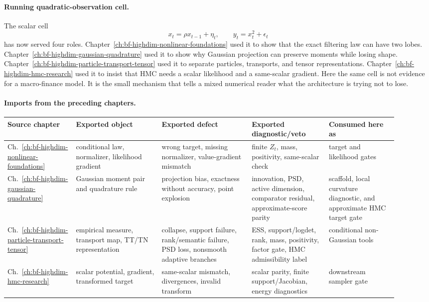 \paragraph{Running quadratic-observation cell.}
The scalar cell
\[
  x_t=\rho x_{t-1}+\eta_t,\qquad y_t=x_t^2+\epsilon_t
\]
has now served four roles.  Chapter~\ref{ch:bf-highdim-nonlinear-foundations}
used it to show that the exact filtering law can have two lobes.
Chapter~\ref{ch:bf-highdim-gaussian-quadrature} used it to show why Gaussian
projection can preserve moments while losing shape.
Chapter~\ref{ch:bf-highdim-particle-transport-tensor} used it to separate
particles, transports, and tensor representations.
Chapter~\ref{ch:bf-highdim-hmc-research} used it to insist that HMC needs a
scalar likelihood and a same-scalar gradient.  Here the same cell is not
evidence for a macro-finance model.  It is the small mechanism that tells a
mixed numerical reader what the architecture is trying not to lose.

\paragraph{Imports from the preceding chapters.}
\begingroup
\scriptsize
\setlength{\tabcolsep}{2pt}
\begin{longtable}{@{}p{0.16\linewidth}p{0.20\linewidth}p{0.21\linewidth}p{0.18\linewidth}p{0.16\linewidth}@{}}
\toprule
Source chapter & Exported object & Exported defect & Exported diagnostic/veto
& Consumed here as \\
\midrule
\endhead
Ch.~\ref{ch:bf-highdim-nonlinear-foundations} & conditional law, normalizer,
likelihood gradient & wrong target, missing normalizer, value-gradient
mismatch & finite \(Z_t\), mass, positivity, same-scalar check & target and
likelihood gates \\
Ch.~\ref{ch:bf-highdim-gaussian-quadrature} & Gaussian moment pair and
quadrature rule & projection bias, exactness without accuracy, point explosion
& innovation, PSD, active dimension, comparator residual, approximate-score
parity & scaffold, local curvature diagnostic, and approximate HMC target gate \\
Ch.~\ref{ch:bf-highdim-particle-transport-tensor} & empirical measure,
transport map, TT/TN representation & collapse, support failure, rank/semantic
failure, PSD loss, nonsmooth adaptive branches & ESS, support/logdet, rank,
mass, positivity, factor gate, HMC admissibility label & conditional
non-Gaussian tools \\
Ch.~\ref{ch:bf-highdim-hmc-research} & scalar potential, gradient, transformed
target & same-scalar mismatch, divergences, invalid transform & scalar parity,
finite support/Jacobian, energy diagnostics & downstream sampler gate \\
\bottomrule
\end{longtable}
\endgroup


